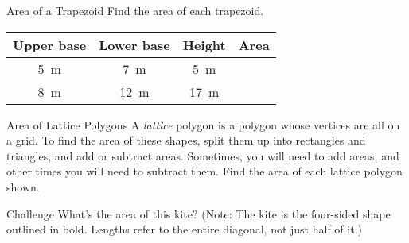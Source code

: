 \documentclass[14pt,letterpaper]{article}
\begin{document}
\begin{problem}{Area of a Trapezoid}
 Find the area of each trapezoid.

 \begin{center}
 \begin{tabular}{|c|c|c|c|}
  \hline
  Upper base & Lower base & Height & Area \\
  \hline
  \SI{5}{\metre} & \SI{7}{\metre} & \SI{5}{\metre} & \\
  \SI{8}{\metre} & \SI{12}{\metre} & \SI{17}{\metre} & \\
  \hline
 \end{tabular}
 \end{center}
\end{problem}

\begin{problem}{Area of Lattice Polygons}
  A \emph{lattice} polygon is a polygon whose vertices are all on a grid. To
  find the area of these shapes, split them up into rectangles and triangles,
  and add or subtract areas. Sometimes, you will need to add areas, and other
  times you will need to subtract them. Find the area of each lattice polygon
  shown.

  \begin{center}
  \end{center}
\end{problem}

\begin{problem}{Challenge}
 What's the area of this kite? (Note: The kite is the four-sided shape outlined
 in bold. Lengths refer to the entire diagonal, not just half of it.)

 \begin{center}
 \end{center}
\end{problem}
\end{document}
